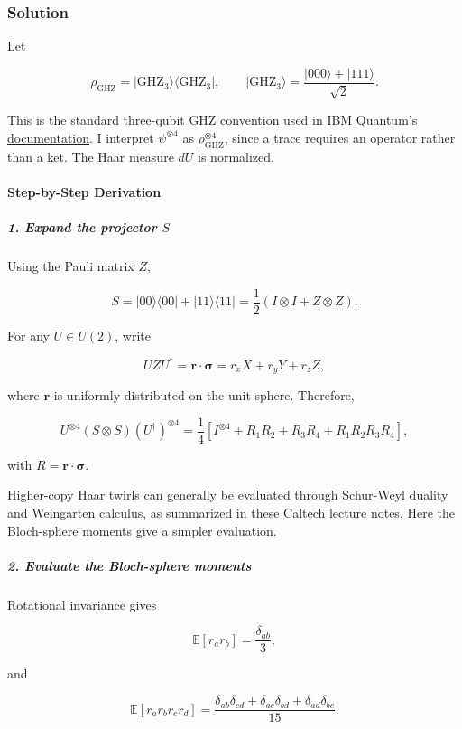 \subsubsection*{Solution}
Let

\[
\rho_{\mathrm{GHZ}} = |\mathrm{GHZ}_3\rangle\langle\mathrm{GHZ}_3|, \qquad |\mathrm{GHZ}_3\rangle = \frac{|000\rangle+|111\rangle}{\sqrt2}.
\]

This is the standard three-qubit GHZ convention used in \href{\detokenize{https://quantum.cloud.ibm.com/learning/en/courses/basics-of-quantum-information/multiple-systems/quantum-information}}{IBM Quantum's documentation}. I interpret $\psi^{\otimes4}$ as $\rho_{\mathrm{GHZ}}^{\otimes4}$, since a trace requires an operator rather than a ket. The Haar measure $dU$ is normalized.

\paragraph*{Step-by-Step Derivation}

\subparagraph*{1. Expand the projector $S$}

Using the Pauli matrix $Z$,

\[
S=|00\rangle\langle00|+|11\rangle\langle11| =\frac{1}{2}\left(I\otimes I+Z\otimes Z\right).
\]

For any $U\in U(2)$, write

\[
UZU^\dagger=\boldsymbol r\cdot\boldsymbol\sigma =r_xX+r_yY+r_zZ,
\]

where $\boldsymbol r$ is uniformly distributed on the unit sphere. Therefore,

\[
U^{\otimes4}(S\otimes S)(U^\dagger)^{\otimes4} = \frac14\left[ I^{\otimes4} +R_1R_2 +R_3R_4 +R_1R_2R_3R_4 \right],
\]

with $R=\boldsymbol r\cdot\boldsymbol\sigma$.

Higher-copy Haar twirls can generally be evaluated through Schur-Weyl duality and Weingarten calculus, as summarized in these \href{\detokenize{https://caltech-quantum-learning-theory.github.io/materials/Note_Learning_Predicting_States.pdf}}{Caltech lecture notes}. Here the Bloch-sphere moments give a simpler evaluation.

\subparagraph*{2. Evaluate the Bloch-sphere moments}

Rotational invariance gives

\[
\mathbb E[r_a r_b]=\frac{\delta_{ab}}{3},
\]

and

\[
\mathbb E[r_a r_b r_c r_d] = \frac{ \delta_{ab}\delta_{cd} +\delta_{ac}\delta_{bd} +\delta_{ad}\delta_{bc} }{15}.
\]

